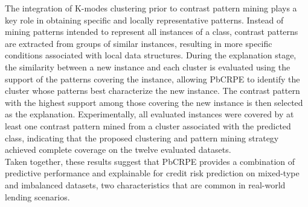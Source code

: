 {	The integration of K-modes clustering prior to contrast pattern mining plays a key role in obtaining specific and locally representative patterns. Instead of mining patterns intended to represent all instances of a class, contrast patterns are extracted from groups of similar instances, resulting in more specific conditions associated with local data structures. During the explanation stage, the similarity between a new instance and each cluster is evaluated using the support of the patterns covering the instance, allowing PbCRPE to identify the cluster whose patterns best characterize the new instance. The contrast pattern with the highest support among those covering the new instance is then selected as the explanation. Experimentally, all evaluated instances were covered by at least one contrast pattern mined from a cluster associated with the predicted class, indicating that the proposed clustering and pattern mining strategy achieved complete coverage on the twelve evaluated datasets.\\
	
	Taken together, these results suggest that PbCRPE provides a combination of predictive performance and explainable for credit risk prediction on mixed-type and imbalanced datasets, two characteristics that are common in real-world lending scenarios.
	
	
}